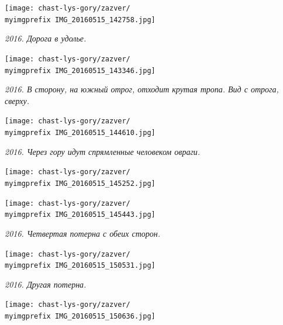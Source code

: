 \begin{center}
\texttt{[image: chast-lys-gory/zazver/\\myimgprefix IMG\_20160515\_142758.jpg]}

\textit{2016. Дорога в удолье.}
\end{center}

\newpage
\vspace*{\fill}
\begin{center}
\texttt{[image: chast-lys-gory/zazver/\\myimgprefix IMG\_20160515\_143346.jpg]}

\textit{2016. В сторону, на южный отрог, отходит крутая тропа. Вид с отрога, сверху.}
\end{center}
\vspace*{\fill}

\newpage
\vspace*{\fill}
\begin{center}
\texttt{[image: chast-lys-gory/zazver/\\myimgprefix IMG\_20160515\_144610.jpg]}

\textit{2016. Через гору идут спрямленные человеком овраги.}
\end{center}
\vspace*{\fill}

\newpage
\vspace*{\fill}
\begin{center}
\texttt{[image: chast-lys-gory/zazver/\\myimgprefix IMG\_20160515\_145252.jpg]}
\end{center}

\begin{center}
\texttt{[image: chast-lys-gory/zazver/\\myimgprefix IMG\_20160515\_145443.jpg]}

\textit{2016. Четвертая потерна с обеих сторон.}
\end{center}
\vspace*{\fill}
\newpage
\vspace*{\fill}

\begin{center}
\texttt{[image: chast-lys-gory/zazver/\\myimgprefix IMG\_20160515\_150531.jpg]}

\textit{2016. Другая потерна.}
\end{center}
\vspace*{\fill}

\newpage
\vspace*{\fill}
\begin{center}
\texttt{[image: chast-lys-gory/zazver/\\myimgprefix IMG\_20160515\_150636.jpg]}

\end{center}

